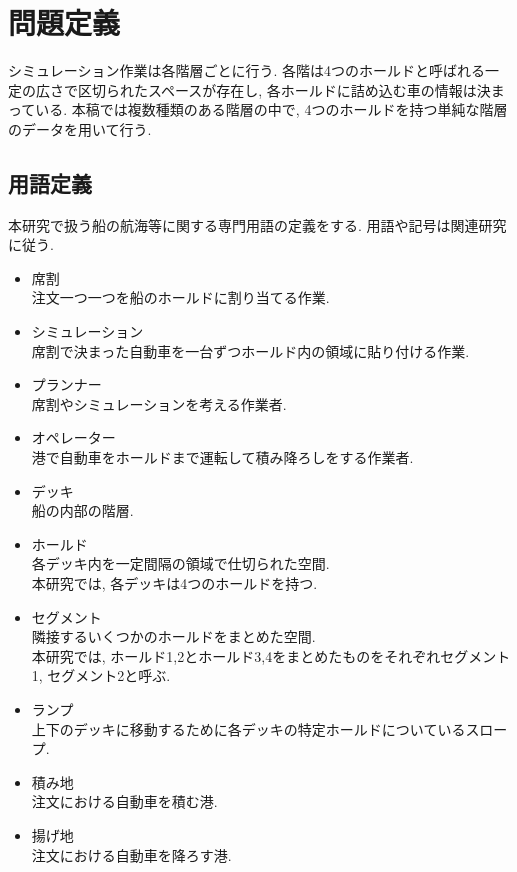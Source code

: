 \graphicspath{{./sozai/}}
\chapter{問題定義}\label{definition}

シミュレーション作業は各階層ごとに行う.
各階は4つのホールドと呼ばれる一定の広さで区切られたスペースが存在し, 各ホールドに詰め込む車の情報は決まっている.
本稿では複数種類のある階層の中で, 4つのホールドを持つ単純な階層のデータを用いて行う.


\section{用語定義}
本研究で扱う船の航海等に関する専門用語の定義をする. 
用語や記号は関連研究\cite{takeda}に従う.

\begin{itemize}
    \item 席割 \\
    注文一つ一つを船のホールドに割り当てる作業.

    \item シミュレーション \\
    席割で決まった自動車を一台ずつホールド内の領域に貼り付ける作業.

    \item  プランナー \\
    席割やシミュレーションを考える作業者.

    \item  オペレーター\\
    港で自動車をホールドまで運転して積み降ろしをする作業者.

    \item デッキ \\
    船の内部の階層.

    \item ホールド \\
    各デッキ内を一定間隔の領域で仕切られた空間. \\
    本研究では, 各デッキは4つのホールドを持つ.

    \item セグメント \\
    隣接するいくつかのホールドをまとめた空間. \\
    本研究では, ホールド1,2とホールド3,4をまとめたものをそれぞれセグメント1, セグメント2と呼ぶ.

    \item ランプ \\
    上下のデッキに移動するために各デッキの特定ホールドについているスロープ.

    \item 積み地 \\
    注文における自動車を積む港.

    \item 揚げ地 \\
    注文における自動車を降ろす港.

\end{itemize}


